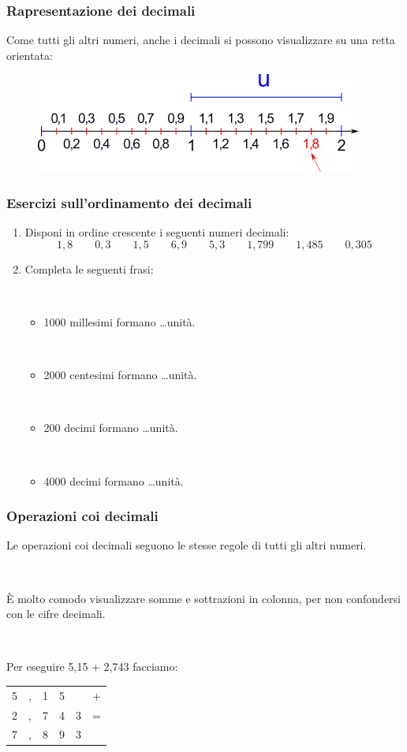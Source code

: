 \documentclass[handout]{beamer}
\theoremstyle{plain}
\begin{document}
\begin{frame}
\frametitle{Rapresentazione dei decimali}
Come tutti gli altri numeri, anche i decimali si possono \alert{visualizzare su una retta orientata}:

\begin{figure}
  \includegraphics[width=.8\columnwidth]{img/rettadecimali.png}
\end{figure}
\end{frame}




\begin{frame}
\frametitle{Esercizi sull'ordinamento dei decimali}
\begin{enumerate}
  \item Disponi in ordine crescente i seguenti numeri decimali:
    \[ 1,8\qquad0,3\qquad1,5\qquad6,9\qquad5,3\qquad1,799\qquad1,485\qquad0,305 \]
  \item Completa le seguenti frasi:
  
  ~
    \begin{itemize}
        \item 1000 millesimi formano \ldots unità.
        
        ~
        \item 2000 centesimi formano \ldots unità.
        
        ~
        \item 200 decimi formano \ldots unità.
        
        ~
        \item 4000 decimi formano \ldots unità.
    \end{itemize}
\end{enumerate}
\end{frame}



\begin{frame}
\frametitle{Operazioni coi decimali}
Le operazioni coi decimali seguono le stesse regole di tutti gli altri numeri.\pause

~

È molto comodo visualizzare somme e sottrazioni \alert{in colonna}, per non confondersi con le cifre decimali.

~

Per eseguire 5,15 + 2,743 facciamo:
\begin{table}[]\def\arraystretch{1.2}
  \begin{tabular}{llllll}
  5 & , & 1 & 5 &   & + \\
  2 & , & 7 & 4 & 3 & = \\\hline
  7 & , & 8 & 9 & 3 &   \\
  \end{tabular}
  \end{table}

\end{frame}
\end{document}
